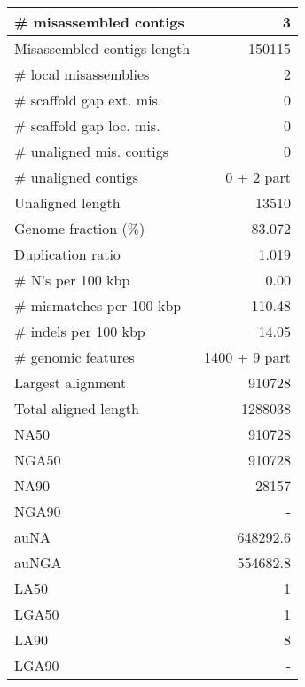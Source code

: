 \documentclass[12pt,a4paper]{article}
\begin{document}
\begin{table}[ht]
\begin{center}
\begin{tabular}{|l*{1}{|r}|}
\# misassembled contigs & 3 \\ \hline
Misassembled contigs length & 150115 \\ \hline
\# local misassemblies & 2 \\ \hline
\# scaffold gap ext. mis. & 0 \\ \hline
\# scaffold gap loc. mis. & 0 \\ \hline
\# unaligned mis. contigs & 0 \\ \hline
\# unaligned contigs & 0 + 2 part \\ \hline
Unaligned length & 13510 \\ \hline
Genome fraction (\%) & 83.072 \\ \hline
Duplication ratio & 1.019 \\ \hline
\# N's per 100 kbp & 0.00 \\ \hline
\# mismatches per 100 kbp & 110.48 \\ \hline
\# indels per 100 kbp & 14.05 \\ \hline
\# genomic features & 1400 + 9 part \\ \hline
Largest alignment & 910728 \\ \hline
Total aligned length & 1288038 \\ \hline
NA50 & 910728 \\ \hline
NGA50 & 910728 \\ \hline
NA90 & 28157 \\ \hline
NGA90 & - \\ \hline
auNA & 648292.6 \\ \hline
auNGA & 554682.8 \\ \hline
LA50 & 1 \\ \hline
LGA50 & 1 \\ \hline
LA90 & 8 \\ \hline
LGA90 & - \\ \hline
\end{tabular}
\end{center}
\end{table}
\end{document}
